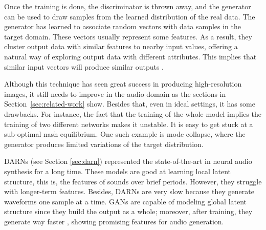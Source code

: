 Once the training is done, the discriminator is thrown away, and the generator can be used to draw samples from the learned distribution of the real data. The generator has learned to associate random vectors with data samples in the target domain. These vectors usually represent some features. As a result, they cluster output data with similar features to nearby input values, offering a natural way of exploring output data with different attributes. This implies that similar input vectors will produce similar outputs \cite{huzaifah_deep_2021}.

Although this technique has seen great success in producing high-resolution images, it still needs to improve in the audio domain as the sections in Section~\ref{sec:related-work} show. Besides that, even in ideal settings, it has some drawbacks. For instance, the fact that the training of the whole model implies the training of two different networks makes it unstable. It is easy to get stuck at a sub-optimal nash equilibrium. One such example is mode collapse, where the generator produces limited variations of the target distribution.

\Acfp{DARN} (see Section \ref{sec:darn}) represented the state-of-the-art in neural audio synthesis for a long time. These models are good at learning local latent structure, this is, the features of sounds over brief periods. However, they struggle with longer-term features. Besides, \acp{DARN} are very slow because they generate waveforms one sample at a time. \Acp{GAN} are capable of modeling global latent structure since they build the output as a whole; moreover, after training, they generate way faster \cite{tahiroglu_-terity_2020}, showing promising features for audio generation.